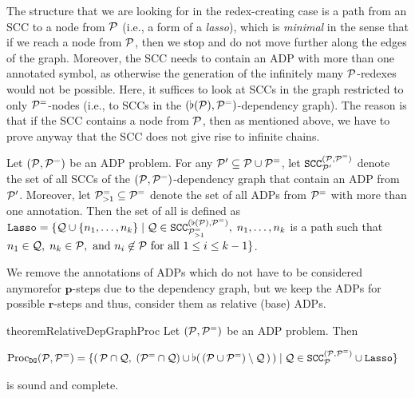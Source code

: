The structure that we are looking for in the redex-creating case is 
 a path from an SCC to a node from $\mathcal{P}$
 (i.e., a form of a \emph{lasso}),
which is \emph{minimal} in the sense that if we reach a node from $\mathcal{P}$, then we stop
and do not move further along the edges of the graph.
Moreover, the SCC needs to contain an ADP with more than one annotated symbol, as otherwise the
generation of the infinitely many
$\mathcal{P}$-redexes would not be possible.
Here, it suffices to look at SCCs in the graph restricted to only $\mathcal{P}^{=}$-nodes (i.e.,
to SCCs in the $(\flat(\mathcal{P}),\mathcal{P}^{=})$-dependency graph).
The reason is that
if the SCC contains a node from $\mathcal{P}$, then as mentioned above,
we have to prove anyway
that the SCC does not give rise to infinite chains.


\begin{definition}[$\mathtt{SCC}^{(\C{P},\C{P}^{=})}_{\C{P}'}$, $\mathtt{Lasso}$]\label{def:lasso}
    Let $(\mathcal{P},\mathcal{P}^{=})$ be an ADP problem.
    For any $\mathcal{P}' \subseteq \mathcal{P} \cup \mathcal{P}^{=}$,
    let $\mathtt{SCC}^{(\C{P},\C{P}^{=})}_{\C{P}'}$ denote 
    the set of all SCCs of the
    $(\mathcal{P},\mathcal{P}^{=})$-dependency graph that contain an ADP from
    $\mathcal{P}'$. Moreover, let  $\mathcal{P}^{=}_{>1} \subseteq \mathcal{P}^{=}$ denote the set of all
    ADPs from $\mathcal{P}^{=}$ with
    more than one annotation.
    Then the set of all  is defined as
    $\mathtt{Lasso} = \{\mathcal{Q} \cup \{n_1, \ldots, n_k\} \mid \mathcal{Q} \in
    \mathtt{SCC}^{(\flat(\mathcal{P}),\mathcal{P}^{=})}_{\mathcal{P}^{=}_{>1}}, \; n_1,\ldots,n_k$ is a path such that $n_1 \in \mathcal{Q}, \; n_k \in \mathcal{P}, \text{ and } n_i \not\in \mathcal{P} \text{ for all } 1 \leq i \leq k-1\}$.
\end{definition}

We remove the annotations of ADPs which do not have to be considered anymore\linebreak for
$\mathbf{p}$-steps due to the dependency graph, 
but we keep the ADPs for possible $\mathbf{r}$-steps and thus, consider
them as relative (base) ADPs.

\begin{restatable}{theorem}{RelativeDepGraphProc}\label{theorem:rel-DGP}
    Let $(\mathcal{P},\mathcal{P}^{=})$ be an ADP problem.
    Then

    \vspace*{-.4cm}
    
    {\small\begin{align*}
        \operatorname{Proc}_{\mathtt{DG}}(\mathcal{P},\mathcal{P}^{=}) & =
        \{ (\,\mathcal{P} \cap \mathcal{Q}, \;
        (\mathcal{P}^= \cap \mathcal{Q})\cup        \flat( \,(\mathcal{P} \cup \mathcal{P}^{=}) \setminus \mathcal{Q} \,)\,
           )
        \mid \mathcal{Q}
        \in \mathtt{SCC}_{\mathcal{P}}^{(\mathcal{P}, \mathcal{P}^{=})} \cup \mathtt{Lasso}\} \! 
    \end{align*}
    }

    \vspace*{-.1cm}

    \noindent
    is sound and complete.   
\end{restatable}

